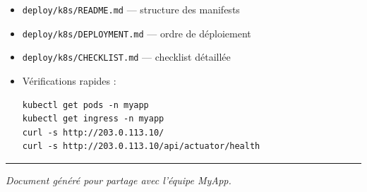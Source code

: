 \documentclass[11pt,a4paper]{article}
\begin{document}
\begin{itemize}
  \item \texttt{deploy/k8s/README.md} — structure des manifests
  \item \texttt{deploy/k8s/DEPLOYMENT.md} — ordre de déploiement
  \item \texttt{deploy/k8s/CHECKLIST.md} — checklist détaillée
  \item Vérifications rapides :
  \begin{lstlisting}
kubectl get pods -n myapp
kubectl get ingress -n myapp
curl -s http://203.0.113.10/
curl -s http://203.0.113.10/api/actuator/health
  \end{lstlisting}
\end{itemize}

\vspace{1em}
\hrule
\vspace{0.5em}
\textit{Document généré pour partage avec l’équipe MyApp.}
\end{document}
